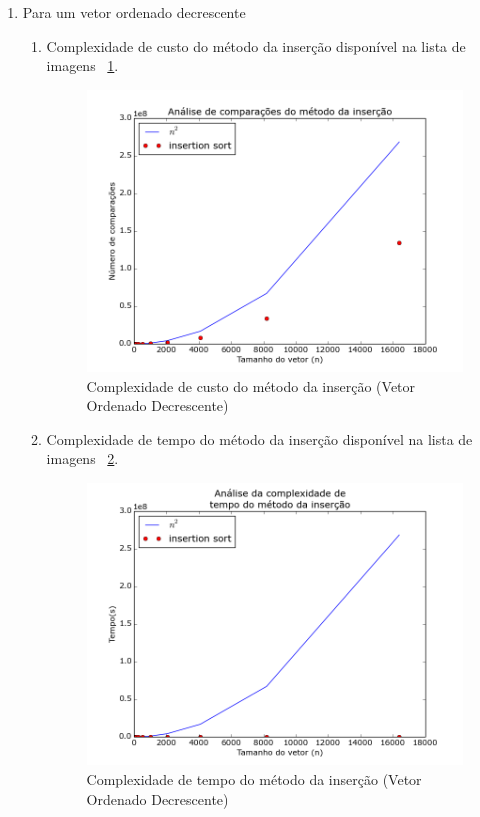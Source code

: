 \documentclass[12pt,a4paper,twoside]{report}
\begin{document}
\begin{enumerate}
\begin{enumerate}
		\end{enumerate}



		\item Para um vetor ordenado decrescente
				\begin{enumerate}
					\item Complexidade de custo do método da inserção disponível na lista de imagens ~\ref{fig:InsertionPlot1OD}.
					\begin{figure}[!h]
						\centering
						\includegraphics[scale=0.6]{../imagens/Insertion/insertion_plot_1_ordenado_decrescente.png}
						\caption{Complexidade de custo do método da inserção (Vetor Ordenado Decrescente) \label{fig:InsertionPlot1OD}}
					\end{figure}


					\item Complexidade de tempo do método da inserção disponível na lista de imagens ~\ref{fig:InsertionPlot2OD}.
					\begin{figure}[!h]
						\centering
						\includegraphics[scale=0.6]{../imagens/Insertion/insertion_plot_2_ordenado_decrescente.png}
						\caption{Complexidade de tempo do método da inserção (Vetor Ordenado Decrescente) \label{fig:InsertionPlot2OD}}
					\end{figure}



\end{enumerate}
\end{enumerate}
\end{document}
